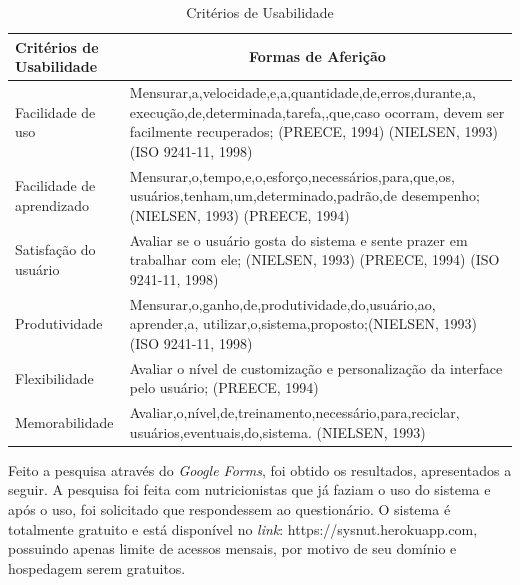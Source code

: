 \documentclass[
	12pt,				%
    oneside,			%
	a4paper,			%
	english,			%
	french,				%
	spanish,			%
	brazil,				%
	]{abntex2}
\begin{document}
\begin{table}[hbt]
\centering
\begin{tabular}{p{5cm}|p{10cm}}
\hline
\textbf{Critérios de Usabilidade} & \multicolumn{1}{c}{\textbf{Formas de Aferição}}                                                                                                                                                                    \\ \hline
Facilidade de uso                 & Mensurar,a,velocidade,e,a,quantidade,de,erros,durante,a,
execução,de,determinada,tarefa,,que,caso ocorram, devem ser facilmente recuperados; (PREECE, 1994) (NIELSEN, 1993) (ISO 9241-11, 1998) \\ \hline
Facilidade de aprendizado         & Mensurar,o,tempo,e,o,esforço,necessários,para,que,os,
usuários,tenham,um,determinado,padrão,de desempenho; (NIELSEN, 1993) (PREECE, 1994)                                                       \\ \hline
Satisfação do usuário             & Avaliar se o usuário gosta do sistema e sente prazer em trabalhar com ele; (NIELSEN, 1993) (PREECE, 1994) (ISO 9241-11, 1998)                                                                  \\ \hline
Produtividade                     & Mensurar,o,ganho,de,produtividade,do,usuário,ao,
aprender,a,
utilizar,o,sistema,proposto;(NIELSEN, 1993) (ISO 9241-11, 1998)                                                                     \\ \hline
Flexibilidade                     & Avaliar o nível de customização e personalização da interface pelo usuário; (PREECE, 1994)                                                                                                     \\ \hline
Memorabilidade                    & Avaliar,o,nível,de,treinamento,necessário,para,reciclar,
usuários,eventuais,do,sistema. (NIELSEN, 1993)                                                                                         \\ \hline
\end{tabular}
\label{tableNogueira} 
\caption{Critérios de Usabilidade \cite{nogueira}}
\end{table}

Feito a pesquisa através do \textit{Google Forms}, foi obtido os resultados, apresentados a seguir. A pesquisa foi feita com nutricionistas que já faziam o uso do sistema e após o uso, foi solicitado que respondessem ao questionário. O sistema é totalmente gratuito e está disponível no \textit{link}: https://sysnut.herokuapp.com, possuindo apenas limite de acessos mensais, por motivo de seu domínio e hospedagem serem gratuitos.
\end{document}

